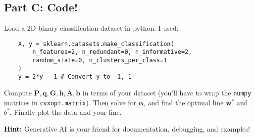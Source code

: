 \documentclass{article}
\begin{document}
\subsection*{Part C: Code!}

Load a 2D binary classification dataset in python.
I used:

\begin{verbatim}
    X, y = sklearn.datasets.make_classification(
        n_features=2, n_redundant=0, n_informative=2, 
        random_state=0, n_clusters_per_class=1
    )
    y = 2*y - 1 # Convert y to -1, 1
\end{verbatim}

Compute $\mathbf{P, q, G, h, A, b}$ in terms of your dataset (you'll have to wrap the \texttt{numpy} matrices in \texttt{cvxopt.matrix}).
Then solve for $\boldsymbol{\alpha}$, and find the optimal line $\mathbf{w}^*$ and $b^*$.
Finally plot the data and your line.

\textbf{Hint:} Generative AI is your friend for documentation, debugging, and examples!

%
\end{document}
